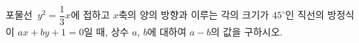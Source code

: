 포물선~$y^2=\dfrac{1}{3}x$에 접하고 $x$축의 양의 방향과 이루는 각의 크기가 $45^\circ$인 직선의 방정식이 $ax+by+1=0$일 때, 상수 $a$, $b$에 대하여 $a-b$의 값을 구하시오.

